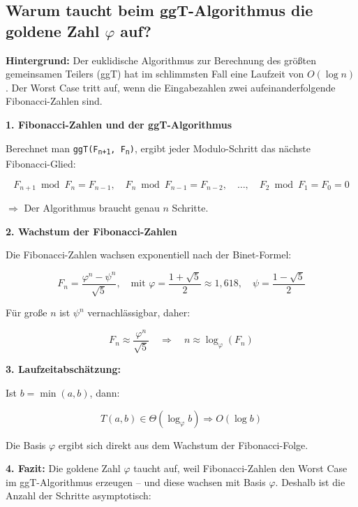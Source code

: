 \documentclass[a4paper,12pt]{article}
\begin{document}
	\subsection*{Warum taucht beim ggT-Algorithmus die goldene Zahl \( \varphi \) auf?}
	
	\textbf{Hintergrund:}  
	Der euklidische Algorithmus zur Berechnung des größten gemeinsamen Teilers (ggT) hat im schlimmsten Fall eine Laufzeit von \( O(\log n) \).  
	Der Worst Case tritt auf, wenn die Eingabezahlen zwei aufeinanderfolgende Fibonacci-Zahlen sind.
	
	\vspace{1em}
	\textbf{1. Fibonacci-Zahlen und der ggT-Algorithmus}
	
	Berechnet man \texttt{ggT(F\textsubscript{n+1}, F\textsubscript{n})}, ergibt jeder Modulo-Schritt das nächste Fibonacci-Glied:
	
	\[
	F_{n+1} \bmod F_n = F_{n-1},\quad
	F_n \bmod F_{n-1} = F_{n-2},\quad \dots,\quad
	F_2 \bmod F_1 = F_0 = 0
	\]
	
	\(\Rightarrow\) Der Algorithmus braucht genau \( n \) Schritte.
	
	\vspace{1em}
	\textbf{2. Wachstum der Fibonacci-Zahlen}
	
	Die Fibonacci-Zahlen wachsen exponentiell nach der Binet-Formel:
	
	\[
	F_n = \frac{\varphi^n - \psi^n}{\sqrt{5}}, \quad
	\text{mit } \varphi = \frac{1 + \sqrt{5}}{2} \approx 1{,}618,\quad
	\psi = \frac{1 - \sqrt{5}}{2}
	\]
	
	Für große \( n \) ist \( \psi^n \) vernachlässigbar, daher:
	
	\[
	F_n \approx \frac{\varphi^n}{\sqrt{5}}
	\quad \Rightarrow \quad
	n \approx \log_\varphi(F_n)
	\]
	
	\vspace{1em}
	\textbf{3. Laufzeitabschätzung:}
	
	Ist \( b = \min(a, b) \), dann:
	
	\[
	T(a, b) \in \Theta(\log_\varphi b) \Rightarrow O(\log b)
	\]
	
	Die Basis \( \varphi \) ergibt sich direkt aus dem Wachstum der Fibonacci-Folge.
	
	\vspace{1em}
	\textbf{4. Fazit:}  
	Die goldene Zahl \( \varphi \) taucht auf, weil Fibonacci-Zahlen den Worst Case im ggT-Algorithmus erzeugen  
	– und diese wachsen mit Basis \( \varphi \). Deshalb ist die Anzahl der Schritte asymptotisch:
	
\end{document}
